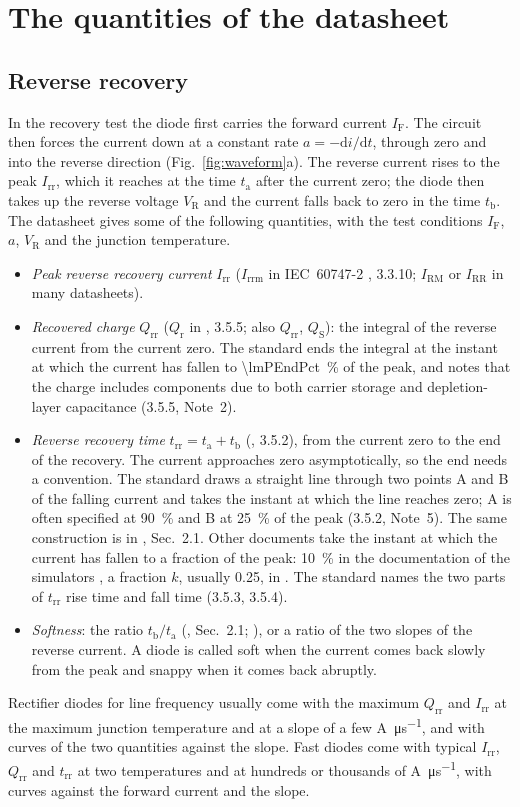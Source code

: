 \documentclass[10pt,a4paper]{scrartcl}
\newcommand{\IF}{I_\mathrm{F}}
\newcommand{\VR}{V_\mathrm{R}}
\newcommand{\Irr}{I_\mathrm{rr}}
\newcommand{\Qrr}{Q_\mathrm{rr}}
\newcommand{\trr}{t_\mathrm{rr}}
\newcommand{\ta}{t_\mathrm{a}}
\newcommand{\tb}{t_\mathrm{b}}
\newcommand{\diff}{\mathrm{d}}
\newcommand{\Aus}{\si{\ampere\per\micro\second}}
\begin{document}
\section{The quantities of the datasheet}
\label{sec:datasheet}
\subsection{Reverse recovery}
\label{sec:rrdata}
In the recovery test the diode first carries the forward current $\IF$. The circuit then forces the current down at a constant rate $a = -\diff i/\diff t$, through zero and into the reverse direction (Fig.~\ref{fig:waveform}a). The reverse current rises to the peak $\Irr$, which it reaches at the time $\ta$ after the current zero; the diode then takes up the reverse voltage $\VR$ and the current falls back to zero in the time $\tb$. The datasheet gives some of the following quantities, with the test conditions $\IF$, $a$, $\VR$ and the junction temperature.
\begin{itemize}
\item \emph{Peak reverse recovery current} $\Irr$ ($I_\mathrm{rrm}$ in IEC~60747-2 \cite{iec60747}, 3.3.10; $I_\mathrm{RM}$ or $I_\mathrm{RR}$ in many datasheets).
\item \emph{Recovered charge} $\Qrr$ ($Q_\mathrm{r}$ in \cite{iec60747}, 3.5.5; also $Q_\mathrm{rr}$, $Q_\mathrm{S}$): the integral of the reverse current from the current zero. The standard ends the integral at the instant at which the current has fallen to \SI{\lmPEndPct}{\percent} of the peak, and notes that the charge includes components due to both carrier storage and depletion-layer capacitance (3.5.5, Note~2).
\item \emph{Reverse recovery time} $\trr = \ta + \tb$ (\cite{iec60747}, 3.5.2), from the current zero to the end of the recovery. The current approaches zero asymptotically, so the end needs a convention. The standard draws a straight line through two points A and B of the falling current and takes the instant at which the line reaches zero; A is often specified at \SI{90}{\percent} and B at \SI{25}{\percent} of the peak (3.5.2, Note~5). The same construction is in \cite{an6481}, Sec.~2.1. Other documents take the instant at which the current has fallen to a fraction of the peak: \SI{10}{\percent} in the documentation of the simulators \cite{mathworks,plecs}, a fraction $k$, usually \num{0.25}, in \cite{an5028}. The standard names the two parts of $\trr$ rise time and fall time (3.5.3, 3.5.4).
\item \emph{Softness}: the ratio $\tb/\ta$ (\cite{an6481}, Sec.~2.1; \cite{an5028}), or a ratio of the two slopes of the reverse current. A diode is called soft when the current comes back slowly from the peak and snappy when it comes back abruptly.
\end{itemize}
Rectifier diodes for line frequency usually come with the maximum $\Qrr$ and $\Irr$ at the maximum junction temperature and at a slope of a few \Aus, and with curves of the two quantities against the slope. Fast diodes come with typical $\Irr$, $\Qrr$ and $\trr$ at two temperatures and at hundreds or thousands of \Aus, with curves against the forward current and the slope.
\end{document}
